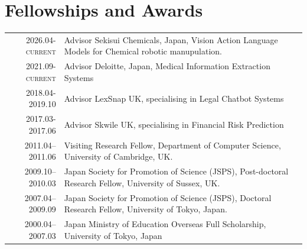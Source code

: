 \documentclass[a4paper,11pt]{article}
\begin{document}
\section{Fellowships and Awards}
\begin{tabular}{r p{11cm}}
  \textsc{2026.04-current} & Advisor Sekisui Chemicals, Japan, Vision Action Language Models for Chemical robotic manupulation.\\
 \textsc{2021.09-current} & Advisor Deloitte, Japan, Medical Information Extraction Systems\\
\textsc{2018.04-2019.10} & Advisor LexSnap UK, specialising in Legal Chatbot Systems\\
\textsc{2017.03-2017.06} & Advisor Skwile UK, specialising in Financial Risk Prediction \\
\textsc{2011.04--2011.06} & Visiting Research Fellow, Department of Computer Science, University of Cambridge, UK. \\
\textsc{2009.10--2010.03} & Japan Society for Promotion of Science (JSPS), Post-doctoral Research Fellow, University of Sussex, UK. \\
\textsc{2007.04--2009.09} & Japan Society for Promotion of Science (JSPS), Doctoral Research Fellow, University of Tokyo, Japan.\\
\textsc{2000.04--2007.03} & Japan Ministry of Education Overseas Full Scholarship, University of Tokyo, Japan
\end{tabular}



\end{document}
